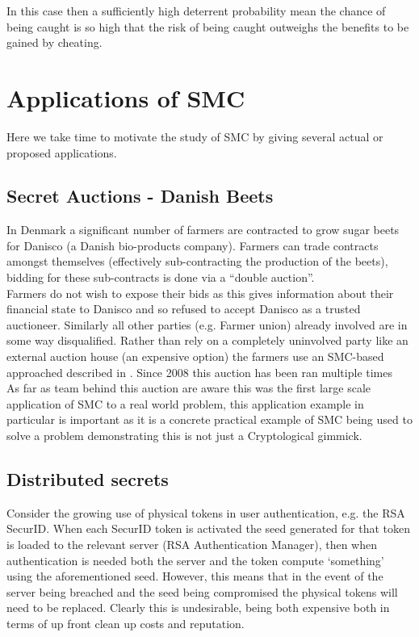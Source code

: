 \documentclass[ %
                    author={Nicholas Tutte},
                supervisor={Prof. Nigel Smart},
                    degree={MEng},
                     title={Secure Two Party Computation},
                  subtitle={A practical comparison of recent protocols},
                      type={Research - GG1K},
                      year={2015} ]{dissertation}
\begin{document}
					{In this case then a sufficiently high deterrent probability mean the chance of being caught is so high that the risk of being caught outweighs the benefits to be gained by cheating.}

		\section{Applications of SMC} \label{sub:Applications}
			Here we take time to motivate the study of SMC by giving several actual or proposed applications.

			\subsection{Secret Auctions - Danish Beets} \label{BeetsAuctionApplication}
				In Denmark a significant number of farmers are contracted to grow sugar beets for Danisco (a Danish bio-products company). Farmers can trade contracts amongst themselves (effectively sub-contracting the production of the beets), bidding for these sub-contracts is done via a ``double auction''.\\

				Farmers do not wish to expose their bids as this gives information about their financial state to Danisco and so refused to accept Danisco as a trusted auctioneer. Similarly all other parties (e.g. Farmer union) already involved are in some way disqualified. Rather than rely on a completely uninvolved party like an external auction house (an expensive option) the farmers use an SMC-based approached described in \cite{SugarBeets}. Since 2008 this auction has been ran multiple times \\

				As far as team behind this auction are aware this was the first large scale application of SMC to a real world problem, this application example in particular is important as it is a concrete practical example of SMC being used to solve a problem demonstrating this is not just a Cryptological gimmick.

			\subsection{Distributed secrets} \label{sub2:DistributedSecretApplication}
				Consider the growing use of physical tokens in user authentication, e.g. the RSA SecurID. When each SecurID token is activated the seed generated for that token is loaded to the relevant server (RSA Authentication Manager), then when authentication is needed both the server and the token compute `something' using the aforementioned seed. However, this means that in the event of the server being breached and the seed being compromised the physical tokens will need to be replaced. Clearly this is undesirable, being both expensive both in terms of up front clean up costs and reputation.\\
\end{document}
